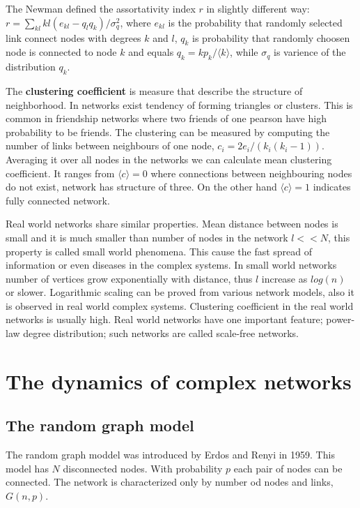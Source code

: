 The Newman defined the assortativity index $r$ in slightly different way:
$r = \sum_{kl}kl(e_{kl} - q_lq_k) / \sigma_q^2$, where $e_{kl}$ is the probability that randomly selected link connect nodes with degrees $k$ and $l$, $q_k$ is probability that randomly choosen node is connected to node $k$ and equals $q_k = kp_k / \langle k \rangle$, while $\sigma_q$ is varience of the distribution $q_k$. 

The \textbf{clustering coefficient} is measure that describe the structure of neighborhood. In networks exist tendency of forming triangles or clusters. This is common in friendship networks where two friends of one pearson have high probability to be friends. The clustering can be measured by computing the number of links between neighbours of one node, $c_i=2e_i/(k_i(k_i-1))$. Averaging it over all nodes in the networks we can calculate mean clustering coefficient. It ranges from  $\langle c \rangle = 0$ where connections between neighbouring nodes do not exist, network has structure of three. On the other hand $\langle c \rangle = 1$ indicates fully connected network. 

Real world networks share similar properties. Mean distance between nodes is small and it is much smaller than number of nodes in the network $l << N$, this property is called small world phenomena. This cause the fast spread of information or even diseases in the complex systems. In small world networks number of vertices grow exponentially with distance, thus $l$ increase as $log(n)$ or slower. Logarithmic scaling can be proved from various network models, also it is observed in real world complex systems. Clustering coefficient in the real world networks is usually high. Real world networks have one important feature; power-law degree distribution; such networks are called scale-free networks.

\section{The dynamics of complex networks}

\subsection{The random graph model }

The random graph moddel was introduced by Erdos and Renyi in 1959. This model has $N$ disconnected nodes. With probability $p$ each pair of nodes can be connected.  The network is characterized only by number od nodes and links, $G(n, p)$. 

